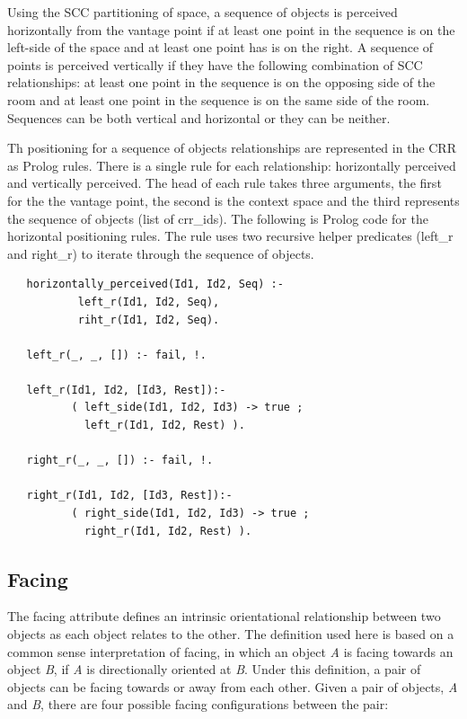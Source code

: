\documentclass[12pt]{ucthesis}
\begin{document}
Using the SCC partitioning of space, a sequence of objects is perceived horizontally from the vantage point if at least one point in the sequence is on the left-side of the space and at least one point has is on the right. A sequence of points is perceived vertically if they have the following combination of SCC relationships: at least one point in the sequence is on the opposing side of the room and at least one point in the sequence is on the same side of the room. Sequences can be both vertical and horizontal or they can be neither.

Th positioning for a sequence of objects relationships are represented in the CRR as Prolog rules. There is a single rule for each relationship: horizontally perceived and vertically perceived. The head of each rule takes three arguments, the first for the the vantage point, the second is the context space and the third represents the sequence of objects (list of crr\_ids). The following is Prolog code for the horizontal positioning rules. The rule uses two recursive helper predicates (left\_r and right\_r) to iterate through the sequence of objects.
\begin{verbatim}
   horizontally_perceived(Id1, Id2, Seq) :-
           left_r(Id1, Id2, Seq),
           riht_r(Id1, Id2, Seq).
           
   left_r(_, _, []) :- fail, !.           
   
   left_r(Id1, Id2, [Id3, Rest]):-
          ( left_side(Id1, Id2, Id3) -> true ;
            left_r(Id1, Id2, Rest) ).
 	 
   right_r(_, _, []) :- fail, !.           
   
   right_r(Id1, Id2, [Id3, Rest]):-
          ( right_side(Id1, Id2, Id3) -> true ;
            right_r(Id1, Id2, Rest) ).
\end{verbatim}


\subsection{Facing}
The facing attribute defines an intrinsic orientational relationship between two objects as each object relates to the other. The definition used here is based on a common sense interpretation of facing, in which an object \emph{A} is facing towards an object \emph{B}, if \emph{A} is directionally oriented at \emph{B}. Under this definition, a pair of objects can be facing towards or away from each other. Given a pair of objects, \emph{A} and \emph{B}, there are four possible facing configurations between the pair: 
\end{document}
